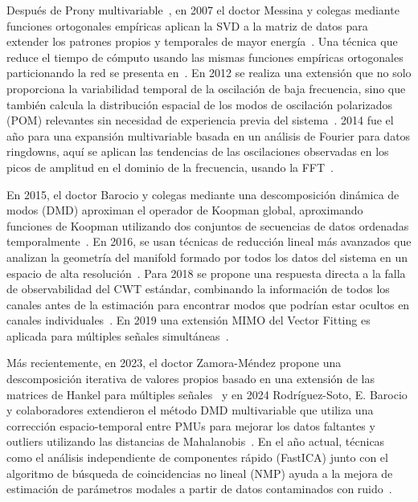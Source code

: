 Después de Prony multivariable~\cite{Trudnowski1999}, en 2007 el doctor Messina y colegas mediante 
funciones ortogonales empíricas aplican la SVD a la matriz de datos para extender los patrones propios 
y temporales de mayor energía~\cite{Messina2007}. Una técnica que reduce el tiempo de cómputo usando las
mismas funciones empíricas ortogonales particionando la red se presenta en~\cite{Esquivel2015}. En 2012 
se realiza una extensión que no solo proporciona la variabilidad temporal de la oscilación de baja 
frecuencia, sino que también calcula la distribución espacial de los modos de oscilación polarizados 
(POM) relevantes sin necesidad de experiencia previa del sistema~\cite{Yang2012}. 2014 fue el año para 
una expansión multivariable basada en un análisis de Fourier para datos ringdowns, aquí se aplican las 
tendencias de las oscilaciones observadas en los picos de amplitud en el dominio de la frecuencia, 
usando la FFT~\cite{Tashman2014}.

En 2015, el doctor Barocio y colegas mediante una descomposición dinámica de modos (DMD) aproximan el 
operador de Koopman global, aproximando funciones de Koopman utilizando dos conjuntos de secuencias de 
datos ordenadas temporalmente~\cite{Barocio2015}. En 2016, se usan técnicas de reducción lineal más 
avanzados que analizan la geometría del manifold formado por todos los datos del sistema en un espacio 
de alta resolución~\cite{Arvizu2016}. Para 2018 se propone una respuesta directa a la falla de 
observabilidad del CWT estándar, combinando la información de todos los canales antes de la estimación 
para encontrar modos que podrían estar ocultos en canales individuales~\cite{Li2018}. En 2019 una 
extensión MIMO del Vector Fitting es aplicada para múltiples señales simultáneas~\cite{Schumacher2019, 
Banuelos2019}.

Más recientemente, en 2023, el doctor Zamora-Méndez propone una descomposición iterativa de valores 
propios basado en una extensión de las matrices de Hankel para múltiples señales~\cite{Zamora2023} y en 
2024 Rodríguez-Soto, E. Barocio y colaboradores extendieron el método DMD multivariable que utiliza una 
corrección espacio-temporal entre PMUs para mejorar los datos faltantes y outliers utilizando las 
distancias de Mahalanobis~\cite{Rodriguez2024}. En el año actual, técnicas como el análisis 
independiente de componentes rápido (FastICA) junto con el algoritmo de búsqueda de coincidencias no 
lineal (NMP) ayuda a la mejora de estimación de parámetros modales a partir de datos contaminados con 
ruido~\cite{Wang2025}.

